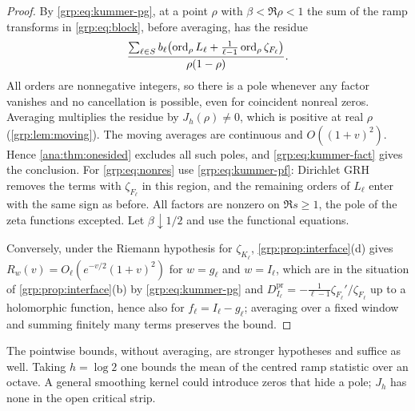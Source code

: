\begin{proof}
By \eqref{grp:eq:kummer-pg}, at a point $\rho$ with $\beta<\Re\rho<1$ the sum
of the ramp transforms in \eqref{grp:eq:block}, before averaging, has the
residue
\[
 \frac{\sum_{\ell\in S}b_\ell\bigl(\operatorname{ord}_\rho L_\ell
 +\frac1{\ell-1}\operatorname{ord}_\rho\zeta_{F_\ell}\bigr)}{\rho(1-\rho)} .
\]
All orders are nonnegative integers, so there is a pole whenever any factor
vanishes and no cancellation is possible, even for coincident nonreal zeros.
Averaging multiplies the residue by $J_h(\rho)\ne0$, which is positive at real
$\rho$ (\cref{grp:lem:moving}). The moving averages are continuous and
$O((1+v)^2)$. Hence \cref{ana:thm:onesided} excludes all such poles, and
\eqref{grp:eq:kummer-fact} gives the conclusion. For \eqref{grp:eq:nonres} use
\eqref{grp:eq:kummer-pf}: Dirichlet GRH removes the terms with
$\zeta_{F_\ell}$ in this region, and the remaining orders of $L_\ell$ enter
with the same sign as before. All factors are nonzero on $\Re s\ge1$, the
pole of the zeta functions excepted. Let $\beta\downarrow1/2$ and use the
functional equations.

Conversely, under the Riemann hypothesis for $\zeta_{K_\ell}$,
\cref{grp:prop:interface}(d) gives
$R_w(v)=O_\ell(e^{-v/2}(1+v)^2)$ for $w=g_\ell$ and $w=I_\ell$, which are in
the situation of \cref{grp:prop:interface}(b) by \eqref{grp:eq:kummer-pg} and
$D^{\mathrm{pr}}_{I_\ell}=-\frac1{\ell-1}\zeta_{F_\ell}'/\zeta_{F_\ell}$ up to a holomorphic
function, hence also for $f_\ell=I_\ell-g_\ell$; averaging over a fixed window
and summing finitely many terms preserves the bound.
\end{proof}

The pointwise bounds, without averaging, are stronger hypotheses and suffice
as well. Taking $h=\log2$ one bounds the mean of the centred ramp statistic
over an octave. A general smoothing kernel could introduce zeros that hide a
pole; $J_h$ has none in the open critical strip.


